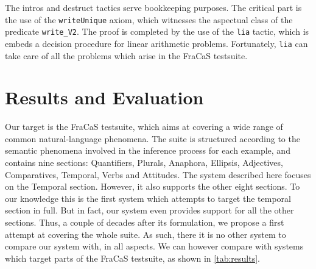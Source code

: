 \documentclass[a4paper,11pt]{article}
\begin{document}
The intros and destruct tactics serve bookkeeping purposes. The
critical part is the use of the \texttt{writeUnique} axiom, which
witnesses the aspectual class of the predicate \texttt{write\_V2}.
The proof is completed by the use of the \texttt{lia} tactic, which is
embeds a decision procedure for linear arithmetic
problems. Fortunately, \texttt{lia} can take care of all the problems
which arise in the FraCaS testsuite.

\section{Results and Evaluation}
\label{sec:results}
Our target is the FraCaS testsuite, which aims at covering a wide
range of common natural-language phenomena. 
%
The suite is structured according to the semantic phenomena involved
in the inference process for each example, and contains nine sections:
Quantifiers, Plurals, Anaphora, Ellipsis, Adjectives, Comparatives,
Temporal, Verbs and Attitudes.  The system described here focuses on
the Temporal section. However, it also supports the other eight
sections.  To our knowledge this is the first system which attempts to
target the temporal section in full. But in fact, our system even provides
support for all the other sections. Thus, a couple of decades after its
formulation, we propose a first attempt at covering the whole suite.
As such, there it is no other system to compare our system with, in
all aspects.  We can however compare with systems which target parts
of the FraCaS testsuite, as shown in \cref{tab:results}.
\end{document}
